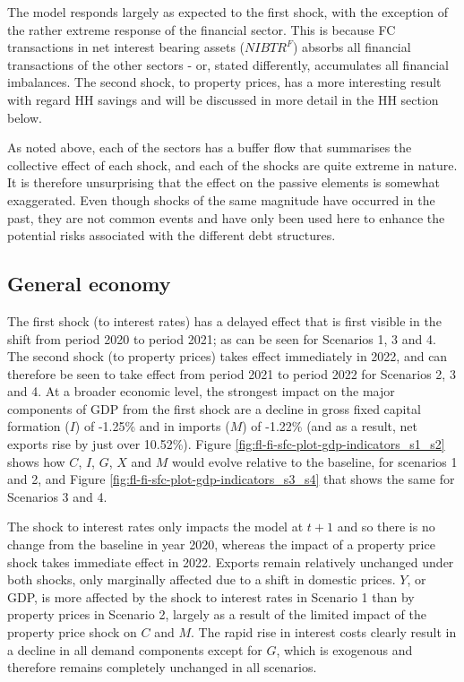 \documentclass[
]{book}
\begin{document}
The model responds largely as expected to the first shock, with the exception of the rather extreme response of the financial sector. This is because FC transactions in net interest bearing assets (\(NIBTR^F\)) absorbs all financial transactions of the other sectors - or, stated differently, accumulates all financial imbalances. The second shock, to property prices, has a more interesting result with regard HH savings and will be discussed in more detail in the HH section below.

As noted above, each of the sectors has a buffer flow that summarises the collective effect of each shock, and each of the shocks are quite extreme in nature. It is therefore unsurprising that the effect on the passive elements is somewhat exaggerated. Even though shocks of the same magnitude have occurred in the past, they are not common events and have only been used here to enhance the potential risks associated with the different debt structures.

\hypertarget{general-economy}{%
\subsection{General economy}\label{general-economy}}

The first shock (to interest rates) has a delayed effect that is first visible in the shift from period 2020 to period 2021; as can be seen for Scenarios 1, 3 and 4. The second shock (to property prices) takes effect immediately in 2022, and can therefore be seen to take effect from period 2021 to period 2022 for Scenarios 2, 3 and 4. At a broader economic level, the strongest impact on the major components of GDP from the first shock are a decline in gross fixed capital formation (\(I\)) of -1.25\% and in imports (\(M\)) of -1.22\% (and as a result, net exports rise by just over 10.52\%). Figure \ref{fig:fl-fi-sfc-plot-gdp-indicators_s1_s2} shows how \(C\), \(I\), \(G\), \(X\) and \(M\) would evolve relative to the baseline, for scenarios 1 and 2, and Figure \ref{fig:fl-fi-sfc-plot-gdp-indicators_s3_s4} that shows the same for Scenarios 3 and 4.

The shock to interest rates only impacts the model at \(t+1\) and so there is no change from the baseline in year 2020, whereas the impact of a property price shock takes immediate effect in 2022. Exports remain relatively unchanged under both shocks, only marginally affected due to a shift in domestic prices. \(Y\), or GDP, is more affected by the shock to interest rates in Scenario 1 than by property prices in Scenario 2, largely as a result of the limited impact of the property price shock on \(C\) and \(M\). The rapid rise in interest costs clearly result in a decline in all demand components except for \(G\), which is exogenous and therefore remains completely unchanged in all scenarios.
\end{document}
